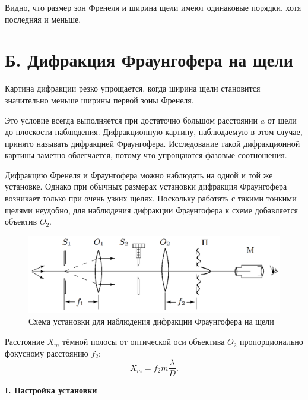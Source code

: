 \documentclass[12pt,a4paper]{article}
\begin{document}
\begin{enumerate}
		Видно, что размер зон Френеля и ширина щели имеют одинаковые порядки, хотя последняя и меньше.
	\end{enumerate}
	
	\section*{Б. Дифракция Фраунгофера на щели}
	
	Картина дифракции резко упрощается, когда ширина щели становится значительно меньше ширины первой зоны Френеля. 
	
	Это условие всегда выполняется при достаточно большом расстоянии $a$ от щели до плоскости наблюдения. Дифракционную картину, наблюдаемую в этом случае, принято называть дифракцией Фраунгофера. Исследование такой дифракционной картины заметно облегчается, потому что упрощаются фазовые соотношения.
	
	Дифракцию Френеля и Фраунгофера можно наблюдать на одной и той же установке. Однако при обычных размерах установки дифракция Фраунгофера возникает только при очень узких щелях. Поскольку работать с такими тонкими щелями неудобно, для наблюдения дифракции Фраунгофера к схеме добавляется объектив $O_2$.
	\begin{figure}[h!]
		\centering
		\includegraphics[scale=0.5]{res/Fraungofer}
		\caption{Схема установки для наблюдения дифракции Фраунгофера на щели}
	\end{figure}
	
	
	Расстояние $X_m$ тёмной полосы от оптической оси объектива $O_2$ пропорционально фокусному расстоянию $f_2$:
	\begin{equation*}
		X_m = f_2 m \frac{\lambda}{D}.
	\end{equation*}

	\begin{center}
		\textbf{I. Настройка установки}
	\end{center}
\end{document}
